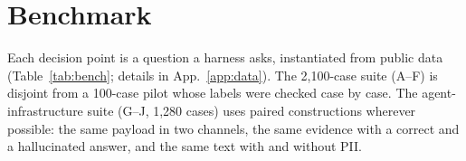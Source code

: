 \section{Benchmark}\label{sec:bench}
Each decision point is a question a harness asks, instantiated from public data (Table~\ref{tab:bench}; details in App.~\ref{app:data}). The 2,100-case suite (A--F) is disjoint from a 100-case pilot whose labels were checked case by case. The agent-infrastructure suite (G--J, 1,280 cases) uses paired constructions wherever possible: the same payload in two channels, the same evidence with a correct and a hallucinated answer, and the same text with and without PII.

\begin{table}[t]
\centering\footnotesize
\setlength{\tabcolsep}{2.5pt}
\caption{Decision points. B2, G2 and J2 are the control experiments of \S\ref{sec:audit}. S adds a policy-labelled gold standard for \S\ref{sec:gates}. $K\in\{2,5,10,20,50\}$ with 80 cases per value. ch = choice, y/n = yes/no.}
\label{tab:bench}
\end{table}

